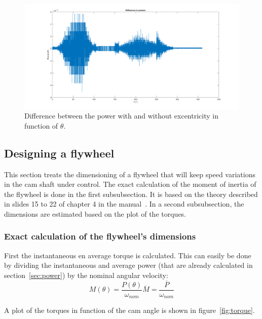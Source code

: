 \documentclass[a4paper]{article}
\begin{document}
\begin{figure}
	\centering
	\includegraphics[width=\textwidth]{diffpower.png}
	\caption{Difference between the power with and without excentricity in function of \(\theta\).}
	\label{diffpower}
\end{figure}

\subsection{Designing a flywheel}

This section treats the dimensioning of a flywheel that will keep speed variations in the cam shaft under control. The exact calculation of the moment of inertia of the flywheel is done in the first subsubsection. It is based on the theory described in slides 15 to 22 of chapter 4 in the manual~\cite{cursus}. In a second subsubsection, the dimensions are estimated based on the plot of the torques.

\subsubsection{Exact calculation of the flywheel's dimensions}

First the instantaneous en average torque is calculated. This can easily be done by dividing the instantaneous and average power (that are already calculated in section~\ref{sec:power}) by the nominal angular velocity:
\begin{subequations}
\begin{equation}
	M(\theta)=\frac{P(\theta)}{\omega_{nom}}
\end{equation}
\begin{equation}
	\overline{M}=\frac{\overline{P}}{\omega_{nom}}
\end{equation}
\end{subequations}

A plot of the torques in function of the cam angle is shown in figure~\ref{fig:torque}. 
\end{document}
